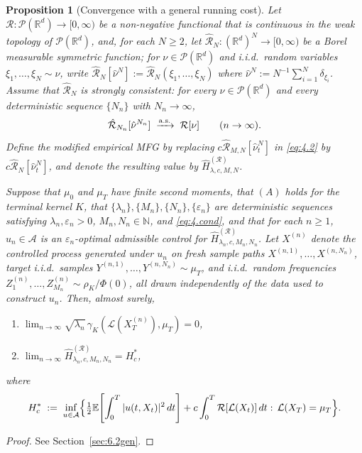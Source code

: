 \documentclass[11pt,leqno]{article}
\theoremstyle{plain}
\newtheorem{prop}[thm]{Proposition}
\theoremstyle{remark}
\theoremstyle{definition}
\numberwithin{equation}{section}
\numberwithin{figure}{section}
\numberwithin{table}{section}
\numberwithin{algorithm}{section}
\newcommand{\EE}{\mathbb{E}}
\newcommand{\RR}{\mathbb{R}}
\newcommand{\cP}{\mathcal{P}}
\begin{document}
\begin{prop}[Convergence with a general running cost]\label{prop:convergence_general}
Let $\mathcal{R}:\cP(\RR^d)\to[0,\infty)$ be a non-negative functional that is continuous in the weak topology of $\cP(\RR^d)$,
and, for each $N\ge 2$, let $\hat{\mathcal{R}}_N:(\RR^d)^N\to[0,\infty)$ be a Borel measurable symmetric function;
for $\nu\in\cP(\RR^d)$ and i.i.d.\ random variables $\xi_1,\ldots,\xi_N\sim\nu$,
write $\hat{\mathcal{R}}_N[\hat\nu^N]:=\hat{\mathcal{R}}_N(\xi_1,\ldots,\xi_N)$
where $\hat\nu^N:=N^{-1}\sum_{i=1}^N\delta_{\xi_i}$.
Assume that $\hat{\mathcal{R}}_N$ is strongly consistent:
for every $\nu\in\cP(\RR^d)$ and every deterministic sequence $\{N_n\}$ with $N_n\to\infty$,
\begin{equation}\label{eq:4.R_general_consistency}
 \hat{\mathcal{R}}_{N_n}[\hat\nu^{N_n}]\;\xrightarrow{\rm a.s.}\;\mathcal{R}[\nu]\qquad(n\to\infty).
\end{equation}
Define the modified empirical MFG by replacing $c\hat{\mathcal{R}}_{M,N}[\hat\nu^N_t]$ in \eqref{eq:4.2} by $c\hat{\mathcal{R}}_{N}[\hat\nu^N_t]$,
and denote the resulting value by $\hat H_{\lambda,c,M,N}^{(\mathcal{R})}$.

Suppose that $\mu_0$ and $\mu_T$ have finite second moments,
that $(A)$ holds for the terminal kernel $K$,
that $\{\lambda_n\},\{M_n\},\{N_n\},\{\varepsilon_n\}$ are deterministic sequences satisfying
$\lambda_n,\varepsilon_n>0$, $M_n,N_n\in\mathbb{N}$, and \eqref{eq:4.cond},
and that for each $n\ge 1$, $u_n\in\mathcal{A}$ is an $\varepsilon_n$-optimal admissible control
for $\hat H_{\lambda_n,c,M_n,N_n}^{(\mathcal{R})}$.
Let $X^{(n)}$ denote the controlled process generated under $u_n$
on fresh sample paths $X^{(n,1)},\ldots,X^{(n,N_n)}$, target i.i.d.\ samples $Y^{(n,1)},\ldots,Y^{(n,N_n)}\sim\mu_T$,
and i.i.d.\ random frequencies $Z^{(n)}_1,\ldots,Z^{(n)}_{M_n}\sim\rho_K/\Phi(0)$,
all drawn independently of the data used to construct $u_n$.
Then, almost surely,
\begin{enumerate}[label=\textup{(\roman*)}]
\item $\displaystyle \lim_{n\to\infty}\sqrt{\lambda_n}\,\gamma_K(\mathcal{L}(X_T^{(n)}),\mu_T)=0$,
\item $\displaystyle \lim_{n\to\infty}\hat H_{\lambda_n,c,M_n,N_n}^{(\mathcal{R})} = H^*_c$,
\end{enumerate}
where
\[
 H^*_c \;:=\; \inf_{u\in\mathcal{A}}\Bigl\{\tfrac{1}{2}\EE\!\left[\int_0^T|u(t,X_t)|^2\,dt\right] + c\int_0^T\mathcal{R}[\mathcal{L}(X_t)]\,dt
 :\,\mathcal{L}(X_T)=\mu_T\Bigr\}.
\]
\end{prop}
\begin{proof}
See Section~\ref{sec:6.2gen}.
\end{proof}
\end{document}
